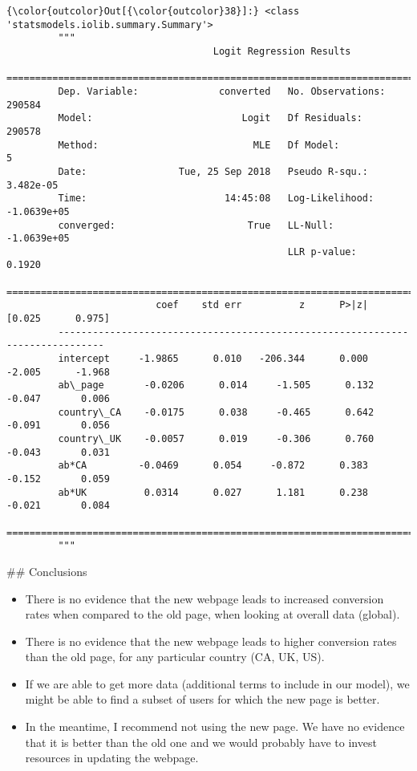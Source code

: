 \documentclass[11pt]{article}
\providecommand{\tightlist}{%
      \setlength{\itemsep}{0pt}\setlength{\parskip}{0pt}}
\begin{document}
\begin{Verbatim}[commandchars=\\\{\}]
{\color{outcolor}Out[{\color{outcolor}38}]:} <class 'statsmodels.iolib.summary.Summary'>
         """
                                    Logit Regression Results                           
         ==============================================================================
         Dep. Variable:              converted   No. Observations:               290584
         Model:                          Logit   Df Residuals:                   290578
         Method:                           MLE   Df Model:                            5
         Date:                Tue, 25 Sep 2018   Pseudo R-squ.:               3.482e-05
         Time:                        14:45:08   Log-Likelihood:            -1.0639e+05
         converged:                       True   LL-Null:                   -1.0639e+05
                                                 LLR p-value:                    0.1920
         ==============================================================================
                          coef    std err          z      P>|z|      [0.025      0.975]
         ------------------------------------------------------------------------------
         intercept     -1.9865      0.010   -206.344      0.000      -2.005      -1.968
         ab\_page       -0.0206      0.014     -1.505      0.132      -0.047       0.006
         country\_CA    -0.0175      0.038     -0.465      0.642      -0.091       0.056
         country\_UK    -0.0057      0.019     -0.306      0.760      -0.043       0.031
         ab*CA         -0.0469      0.054     -0.872      0.383      -0.152       0.059
         ab*UK          0.0314      0.027      1.181      0.238      -0.021       0.084
         ==============================================================================
         """
\end{Verbatim}
            
     \#\# Conclusions

\begin{itemize}
\tightlist
\item
  There is no evidence that the new webpage leads to increased
  conversion rates when compared to the old page, when looking at
  overall data (global).
\item
  There is no evidence that the new webpage leads to higher conversion
  rates than the old page, for any particular country (CA, UK, US).
\item
  If we are able to get more data (additional terms to include in our
  model), we might be able to find a subset of users for which the new
  page is better.
\item
  In the meantime, I recommend not using the new page. We have no
  evidence that it is better than the old one and we would probably have
  to invest resources in updating the webpage.
\end{itemize}


    
    
    
    
\end{document}
